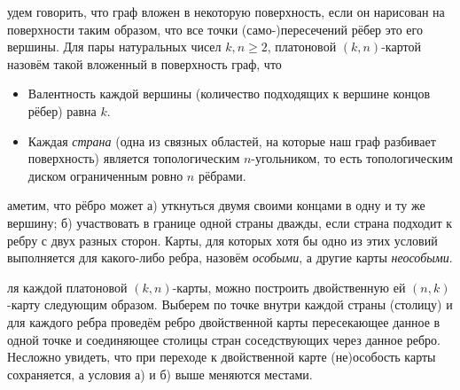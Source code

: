\documentclass[12pt, a4paper, openany]{amsart}
\theoremstyle{plain}
\theoremstyle{definition}
\theoremstyle{remark}
\newcommand{\slava}[1]{{\color{blue}#1}}
\def\slavapar#1\par{\slava{#1}\par}
\begin{document}
\slavapar
Будем говорить, что граф вложен в некоторую поверхность, если он
нарисован на поверхности таким образом, что все точки
(само-)пересечений рёбер это его вершины. Для пары натуральных чисел
$k,n\geq2$, платоновой $(k,n)$-картой назовём такой
вложенный в поверхность граф, что
\begin{itemize}
\item Валентность каждой вершины (количество подходящих к вершине
  концов рёбер) равна $k$.
\item Каждая \textit{страна} (одна из связных областей, на которые наш
  граф разбивает поверхность) является топологическим
  $n$-угольником, то есть топологическим диском ограниченным ровно $n$
  рёбрами.  
\end{itemize} 

\slavapar
Заметим, что рёбро может а) уткнуться двумя своими концами в одну и ту
же вершину; б) участвовать в границе одной страны дважды, если страна
подходит к ребру с двух разных сторон.  Карты, для которых хотя бы одно
из этих условий выполняется для какого-либо ребра, назовём \textit{особыми}, а
другие карты \textit{неособыми}.

\slavapar
Для каждой платоновой $(k,n)$-карты, можно построить двойственную ей
$(n,k)$-карту следующим образом. Выберем по точке внутри каждой страны
(столицу) и для каждого ребра проведём ребро двойственной карты
пересекающее данное в одной точке и соединяющее столицы стран
соседствующих через данное ребро. Несложно увидеть, что при переходе к
двойственной карте (не)особость карты сохраняется, а условия а) и б)
выше меняются местами.
\end{document}
